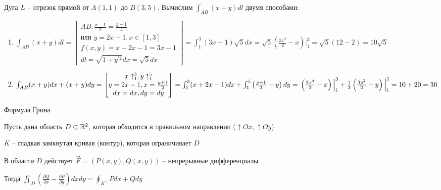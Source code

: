 \documentclass[12pt]{article}
\begin{document}
    \Ex Дуга $L$ -- отрезок прямой от $A(1, 1)$ до $B(3, 5)$. Вычислим $\int_{AB} (x + y) dl$ двумя способами:

    \begin{enumerate}
        \item $\int_{AB} (x + y) dl = \begin{bmatrix}AB: \frac{x - 1}{2} = \frac{y - 1}{4} \\
        \text{или } y = 2x - 1, x \in [1, 3] \\
        f(x, y) = x + 2x - 1 = 3x - 1 \\
        dl = \sqrt{1 + y^{\prime 2}}dx = \sqrt{5}dx\end{bmatrix} =
        \int_1^3 (3x - 1) \sqrt{5}dx = \sqrt{5} \left(\frac{3x^2}{2} - x\right) \Big|_1^3 = \sqrt{5}(12 - 2) = 10\sqrt{5}$

        \item $\int_{AB} (x + y) dx + (x + y) dy = \begin{bmatrix}x \uparrow^3_1, y \uparrow^5_1 \\
        y = 2x - 1, x = \frac{y + 1}{2} \\
        dx = dx, dy = dy\end{bmatrix} = \int_1^3 (x + 2x - 1) dx + \int^5_1 \left(\frac{y + 1}{2} + y\right) dy = \\
        \left(\frac{3x^2}{2} - x\right) \Big|_1^3 + \frac{1}{2} \left(\frac{3y^2}{2} + y\right) \Big|_1^5 = 10 + 20 = 30$
    \end{enumerate}

    \hypertarget{formulaGreen}{}

    \begin{MyTheorem}
        \Ths Формула Грина

        Пусть дана область $D \subset \mathbb{R}^2$, которая обходится в правильном направлении ($\uparrow Ox, \uparrow Oy$)

        $K$ -- гладкая замкнутая кривая (контур), которая ограничивает $D$

        В области $D$ действует $\vec{F} = (P(x, y), Q(x, y))$ -- непрерывные дифференциалы

        Тогда $\iint_D \left(\frac{\partial Q}{\partial x} - \frac{\partial P}{\partial y}\right) dxdy = \oint_{K^+} Pdx + Qdy$
    \end{MyTheorem}
\end{document}
